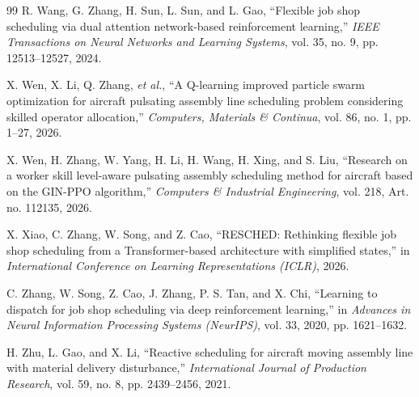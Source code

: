 \documentclass[journal,10pt]{IEEEtran}
\begin{document}
\begin{thebibliography}{99}
 R. Wang, G. Zhang, H. Sun, L. Sun, and L. Gao, ``Flexible job shop scheduling via dual attention network-based reinforcement learning,'' \emph{IEEE Transactions on Neural Networks and Learning Systems}, vol. 35, no. 9, pp. 12513--12527, 2024.

 X. Wen, X. Li, Q. Zhang, \emph{et al.}, ``A Q-learning improved particle swarm optimization for aircraft pulsating assembly line scheduling problem considering skilled operator allocation,'' \emph{Computers, Materials \& Continua}, vol. 86, no. 1, pp. 1--27, 2026.

 X. Wen, H. Zhang, W. Yang, H. Li, H. Wang, H. Xing, and S. Liu, ``Research on a worker skill level-aware pulsating assembly scheduling method for aircraft based on the GIN-PPO algorithm,'' \emph{Computers \& Industrial Engineering}, vol. 218, Art. no. 112135, 2026.

 X. Xiao, C. Zhang, W. Song, and Z. Cao, ``RESCHED: Rethinking flexible job shop scheduling from a Transformer-based architecture with simplified states,'' in \emph{International Conference on Learning Representations (ICLR)}, 2026.

 C. Zhang, W. Song, Z. Cao, J. Zhang, P. S. Tan, and X. Chi, ``Learning to dispatch for job shop scheduling via deep reinforcement learning,'' in \emph{Advances in Neural Information Processing Systems (NeurIPS)}, vol. 33, 2020, pp. 1621--1632.

 H. Zhu, L. Gao, and X. Li, ``Reactive scheduling for aircraft moving assembly line with material delivery disturbance,'' \emph{International Journal of Production Research}, vol. 59, no. 8, pp. 2439--2456, 2021.
\end{thebibliography}
\end{document}
